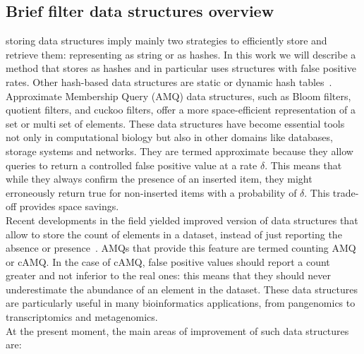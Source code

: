 \subsection{Brief filter data structures overview}
\kmer storing data structures imply mainly two strategies to efficiently store and retrieve them: representing \kmers as string or as hashes\cite{marchet2024kmersets}. In this work we will describe a method that stores \kmers as hashes and in particular uses structures with false positive rates. Other hash-based data structures are static or dynamic hash tables~\cite{sshash}.\\
Approximate Membership Query (AMQ) data structures, such as Bloom filters, quotient filters, and cuckoo filters, offer a more space-efficient representation of a set or multi set of elements. These data structures have become essential tools not only in computational biology but also in other domains like databases, storage systems and networks. They are termed approximate because they allow queries to return a controlled false positive value at a rate $\delta$. This means that while they always confirm the presence of an inserted item, they might erroneously return true for non-inserted items with a probability of $\delta$. This trade-off provides space savings.\\
Recent developments in the \kmer field yielded improved version of data structures that allow to store the count of elements in a dataset, instead of just reporting the absence or presence~\cite{squeakr,pandey,cqf,comin_count,sshash}. AMQs that provide this feature are termed counting AMQ or cAMQ. In the case of cAMQ, false positive values should report a count greater and not inferior to the real ones: this means that they should never underestimate the abundance of an element in the dataset. These data structures are particularly useful in many bioinformatics applications, from pangenomics to transcriptomics and metagenomics.\\
At the present moment, the main areas of improvement of such data structures are:
